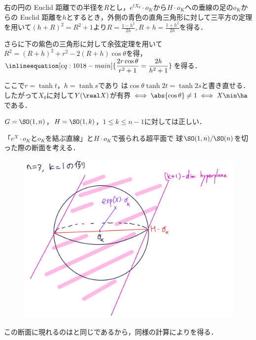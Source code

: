 \begin{pfwn}{}
  右の円の Euclid 距離での半径を$R$とし，$e^{tX_{\theta}}\cdot o_K $から$H\cdot o_K$への垂線の足の$o_K$からの Euclid 距離を$h$とするとき，外側の青色の直角三角形に対して三平方の定理を用いて$(h+R)^2 = R^2 +  1 $より$R = \frac{1-h^2}{2h} , R+h = \frac{1+h^2}{2h}  $を得る．

  さらに下の紫色の三角形に対して余弦定理を用いて$R^2 = (R+h)^2 + r^2 - 2(R+h) \cos\theta  $を得，$\inlineequation[eq:1018-main]{\dfrac{2r\cos\theta}{r^2 + 1} = \dfrac{2h}{h^2 + 1} }$を得る．

  ここで$r = \tanh t$，$h = \tanh s$であり は$\cos\theta \tanh 2t = \tanh 2s $と書き直せる．したがって$X_{\theta}$に対して$Y(\real X) $が有界$\iff \abs{\cos\theta}\neq 1 \iff  X\nin \ha  $である．


\end{pfwn}

\begin{cor}\label{cor:yosou-eg}
  $G = \SO(1,n) $，$H = \SO(1,k) $，$1\leq k\leq n-1$に対しては正しい．
\end{cor}


\begin{pfwn}{}
  「$e^X\cdot o_K $と$o_K$を結ぶ直線」と$H\cdot o_K$で張られる超平面で {\Poincare}球$\SO(1,n)/\SO(n)$を切った際の断面を考える．
  \begin{figure}[H]
    \centering
    \includegraphics[scale=0.1]{../graph/son1.jpg}
    \caption{}
    \label{fig:son1}
  \end{figure}
  
  この断面に現れるのはと同じであるから，同様の計算によりを得る．
  
\end{pfwn}